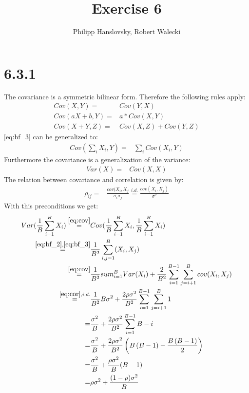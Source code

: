 \documentclass[a4paper,11pt]{article}
\title{Exercise 6}
\author{Philipp Hanslovsky, Robert Walecki}
\theoremstyle{definition}
\theoremstyle{plain}
\theoremstyle{remark}
\begin{document}


\maketitle

\section*{6.3.1}
The covariance is a symmetric bilinear form. Therefore the following rules apply:
\begin{align}
Cov(X,Y) =& Cov(Y,X) \label{eq:bf_1} \\
Cov(aX+b,Y) =& a*Cov(X,Y) \label{eq:bf_2} \\
Cov(X+Y,Z) =& Cov(X,Z)+Cov(Y,Z) \label{eq:bf_3}
\end{align}
\ref{eq:bf_3} can be generalized to:
\begin{align}
Cov(\sum_iX_i, Y) =& \sum_iCov(X_i,Y) \label{eq:bf_4}
\end{align}
Furthermore the covariance is a generalization of the variance:
\begin{align}
Var(X) =& Cov(X,X) \label{eq:cov}
\end{align}
The relation between covariance and correlation is given by:
\begin{align}
\rho_{ij} =& \frac{cov(X_i,X_j}{\sigma_i\sigma_j} \overset{i.d.}{=} \frac{cov(X_i,X_j)}{\sigma^2} \label{eq:cor}
\end{align}
With this preconditions we get:
\begin{align}
Var(\frac{1}{B}\sum_{i=1}^BX_i) \overset{\ref{eq:cov}}{=}& Cov(\frac{1}{B}\sum_{i=1}^BX_i,\frac{1}{B}\sum_{i=1}^BX_i) \\
  \overset{\ref{eq:bf_2}, \ref{eq:bf_3}}{=}&\frac{1}{B^2}\sum_{i,j=1}^B(X_i,X_j) \\
  \overset{\ref{eq:cov}}{=}&\frac{1}{B^2}sum_{i=1}^BVar(X_i)+\frac{2}{B^2}\sum_{i=1}^{B-1}\sum_{j=i+1}^Bcov(X_i,X_j) \\
  \overset{\ref{eq:cor}, i.d.}{=}&\frac{1}{B^2}B\sigma^2+\frac{2\rho\sigma^2}{B^2}\sum_{i=1}^{B-1}\sum_{j=i+1}^B1 \\
  =&\frac{\sigma^2}{B}+\frac{2\rho\sigma^2}{B^2}\sum_{i=1}^{B-1}B-i \\
  =&\frac{\sigma^2}{B}+\frac{2\rho\sigma^2}{B^2}\left(B\left(B-1\right) - \frac{B\left(B-1\right)}{2}\right) \\
  =&\frac{\sigma^2}{B}+\frac{\rho\sigma^2}{B}(B-1) \\
  =&\rho\sigma^2+\frac{(1-\rho)\sigma^2}{B}
\end{align} 
\end{document}
